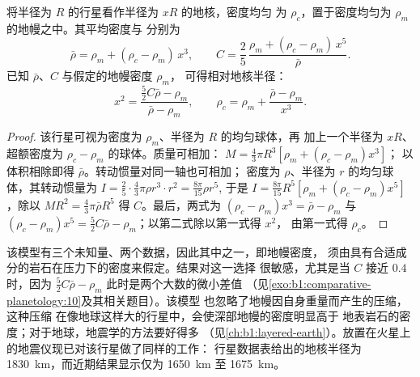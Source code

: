 \begin{proposition}[两层结构的行星]\label{prop:b1:comparative-planetology:two-layer}
将半径为 $R$ 的行星看作半径为 $xR$ 的地核，密度均匀
为 $\rho_c$，置于密度均匀为 $\rho_m$ 的地幔之中。其平均密度与
分别为
\[
  \bar\rho = \rho_m + (\rho_c - \rho_m)\,x^3 , \qquad
  C = \frac25\,\frac{\rho_m + (\rho_c - \rho_m)\,x^5}{\bar\rho} .
\]
已知 $\bar\rho$、$C$ 与假定的地幔密度 $\rho_m$，
可得相对地核半径：
\[
  x^2 = \frac{\tfrac52C\bar\rho - \rho_m}{\bar\rho - \rho_m} ,
  \qquad \rho_c = \rho_m + \frac{\bar\rho - \rho_m}{x^3} .
\]
\end{proposition}

\begin{proof}
该行星可视为密度为 $\rho_m$、半径为 $R$ 的均匀球体，再
加上一个半径为 $xR$、超额密度为 $\rho_c - \rho_m$ 的球体。质量可相加：
$M = \tfrac43\pi R^3[\rho_m + (\rho_c - \rho_m)x^3]$；
以体积相除即得 $\bar\rho$。转动惯量对同一轴也可相加；
密度为 $\rho$、半径为 $r$ 的均匀球体，其转动惯量为
$I = \tfrac25\cdot\tfrac43\pi\rho r^3\cdot r^2 = \tfrac{8\pi}{15}\rho r^5$,
于是 $I = \tfrac{8\pi}{15}R^5[\rho_m + (\rho_c - \rho_m)x^5]$，除以
$MR^2 = \tfrac43\pi\bar\rho R^5$ 得 $C$。最后，两式为
$(\rho_c - \rho_m)x^3 = \bar\rho - \rho_m$ 与 $(\rho_c - \rho_m)x^5 =
\tfrac52C\bar\rho - \rho_m$；以第二式除以第一式得 $x^2$，
由第一式得 $\rho_c$。
\end{proof}

该模型有三个未知量、两个数据，因此其中之一，即地幔密度，
须由具有合适成分的岩石在压力下的密度来假定。结果对这一选择
很敏感，尤其是当 $C$ 接近
$0.4$ 时，因为 $\tfrac52C\bar\rho - \rho_m$ 此时是两个大数的微小差值
（见\cref{exo:b1:comparative-planetology:10}及其相关题目）。该模型
也忽略了地幔因自身重量而产生的压缩，这种压缩
在像地球这样大的行星中，会使深部地幔的密度明显高于
地表岩石的密度；对于地球，地震学的方法要好得多
（见\cref{ch:b1:layered-earth}）。放置在火星上的地震仪现已对该行星做了同样的工作：
行星数据表给出的地核半径为
\qty{1830}{km}，而近期结果显示仅为 \qty{1650}{km} 至
\qty{1675}{km}。

